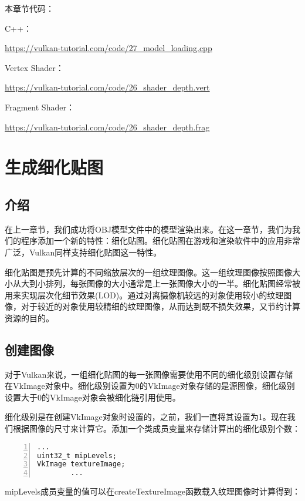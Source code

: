 \documentclass{ctexart}
\begin{document}
本章节代码：

C++：

\url{https://vulkan-tutorial.com/code/27_model_loading.cpp}

Vertex Shader：

\url{https://vulkan-tutorial.com/code/26_shader_depth.vert}

Fragment Shader：

\url{https://vulkan-tutorial.com/code/26_shader_depth.frag}

\newpage
\section{生成细化贴图}

\subsection{介绍}

在上一章节，我们成功将OBJ模型文件中的模型渲染出来。在这一章节，我们为我们的程序添加一个新的特性：细化贴图。细化贴图在游戏和渲染软件中的应用非常广泛，Vulkan同样支持细化贴图这一特性。

细化贴图是预先计算的不同缩放层次的一组纹理图像。这一组纹理图像按照图像大小从大到小排列，每张图像的大小通常是上一张图像大小的一半。细化贴图经常被用来实现层次化细节效果(LOD)。通过对离摄像机较远的对象使用较小的纹理图像，对于较近的对象使用较精细的纹理图像，从而达到既不损失效果，又节约计算资源的目的。

\subsection{创建图像}

对于Vulkan来说，一组细化贴图的每一张图像需要使用不同的细化级别设置存储在VkImage对象中。细化级别设置为0的VkImage对象存储的是源图像，细化级别设置大于0的VkImage对象会被细化链引用使用。

细化级别是在创建VkImage对象时设置的，之前，我们一直将其设置为1。现在我们根据图像的尺寸来计算它。添加一个类成员变量来存储计算出的细化级别个数：

\begin{lstlisting}[language={[ANSI]C},keywordstyle=\color{blue!70},commentstyle=\color{red!50!green!50!blue!50},frame=shadowbox, rulesepcolor=\color{red!20!green!20!blue!20},basicstyle=\small,numbers=left, numberstyle=\tiny,breaklines=true]
		...
uint32_t mipLevels;
VkImage textureImage;
		...
\end{lstlisting}

mipLevels成员变量的值可以在createTextureImage函数载入纹理图像时计算得到：
\end{document}
